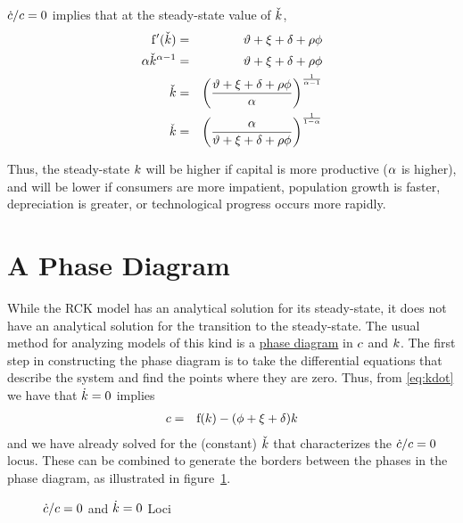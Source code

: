 \documentclass{handout}
\begin{document}
$\dot{c}/c = 0$ implies that at the steady-state value of $\check{{k}}$,
\begin{eqnarray}
  \mathrm{f}^{\prime}(\check{{k}}) & = & \vartheta +\xi+\delta+\rho \phi  \\
  \alpha \check{{k}}^{\alpha-1} & = & \vartheta +\xi+\delta+\rho \phi  \\
  \check{{k}} & = & \left(\frac{\vartheta +\xi+\delta+\rho \phi}{\alpha}\right)^{\frac{1}{\alpha-1}}
  \\      \check{{k}} & = & \left(\frac{\alpha}{\vartheta +\xi+\delta+\rho \phi}\right)^{\frac{1}{1-\alpha}}   
\end{eqnarray}

Thus, the steady-state ${k}$ will be higher if capital 
is more productive ($\alpha$ is higher), and will be lower if 
consumers are more impatient, population growth is faster, 
depreciation is greater, or technological progress occurs more rapidly.

\section{A Phase Diagram}

While the RCK model has an analytical solution for its steady-state,
it does not have an analytical solution for the transition to the 
steady-state.  The usual method for analyzing
models of this kind is a \href{https://en.wikipedia.org/wiki/Phase_diagram}{phase diagram} in $c$ and ${k}$.  
The first step in constructing the phase diagram is to take the differential
equations that describe the system and find the points where they are 
zero.  Thus, from \eqref{eq:kdot} we have that $\dot{{k}}=0$ implies
\begin{eqnarray}
  c & = & \mathrm{f}({k}) - (\phi +\xi+\delta) {k} \label{eq:kdotEq0}
\end{eqnarray}
and we have already solved for the (constant) $\check{{k}}$ that characterizes
the $\dot{c}/c=0$ locus.  These can be combined to generate the borders between
the phases in the phase diagram, as illustrated in figure~\ref{fig:RamseySSPlot}.
\begin{figure}
  \caption{$\dot{c}/c =0 $ and $\dot{{k}}=0$ Loci}\label{fig:RamseySSPlot}
\end{figure}
\end{document}
